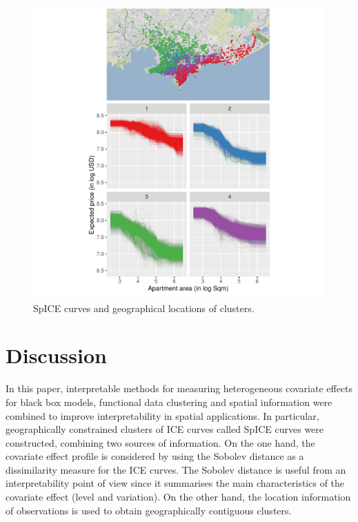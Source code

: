 \documentclass[smallextended,natbib]{svjour3}\usepackage[]{graphicx}\usepackage[]{xcolor}
\newcommand{\1}[1]{\mathbbm{1}_{#1}}
\begin{document}
\begin{figure} 
    \centering
    \includegraphics[scale=0.9]{figures/fig-4grupos-alpha5.pdf}
    \caption{SpICE curves and geographical locations of clusters.}
    \label{fig-spice}
\end{figure}



\section{Discussion} \label{section:4}

In this paper, interpretable methods for measuring heterogeneous covariate effects for black box models, functional data clustering and spatial information were combined to improve interpretability in spatial applications. In particular, geographically constrained clusters of ICE curves called SpICE curves were constructed, combining two sources of information.  On the one hand, the covariate effect profile is considered by using the Sobolev distance as a dissimilarity measure for the ICE curves. The Sobolev distance is useful from an interpretability point of view since it summarises the main characteristics of the covariate effect (level and variation). On the other hand, the location information of observations is used to obtain geographically contiguous clusters. 
\end{document}
